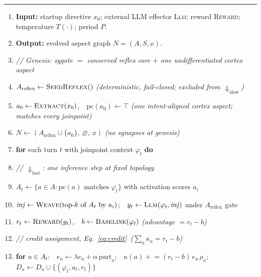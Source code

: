 \documentclass[11pt]{article}
\theoremstyle{definition}
\begin{document}
\begin{algorithm}[t]
\caption{Morphogenetic self-evolution: $\Downarrow_\text{fast}$ interleaved with $\Downarrow_\text{slow}$.}
\label{alg:man}
\small
\hrule\vspace{3pt}
\begin{enumerate}[leftmargin=2.9em,itemsep=1.5pt,topsep=2pt,parsep=0pt,label=\textup{\arabic*:}]
\item \textbf{Input:} startup directive $x_0$; external LLM effector \textsc{Llm}; reward \textsc{Reward}; temperature $T(\cdot)$; period $P$.
\item \textbf{Output:} evolved aspect graph $N=(A,S,x)$.
\item \emph{// Genesis: zygote $=$ conserved reflex core $+$ one undifferentiated cortex aspect}
\item $A_\text{reflex}\gets\textsc{SeedReflex}()$ \quad\emph{(deterministic, fail-closed; excluded from $\Downarrow_\text{slow}$)}
\item $a_0\gets\textsc{Extract}(x_0)$,\ \ $\mathrm{pc}(a_0)\gets\top$ \quad\emph{(one intent-aligned cortex aspect; matches every joinpoint)}
\item $N\gets(A_\text{reflex}\cup\{a_0\},\ \varnothing,\ x)$ \quad\emph{(no synapses at genesis)}
\item \textbf{for} each turn $t$ with joinpoint context $\varphi_t$ \textbf{do}
\item \hspace{1.2em}\emph{// $\Downarrow_\text{fast}$: one inference step at fixed topology}
\item \hspace{1.2em}$A_t\gets\{a\in A:\mathrm{pc}(a)\text{ matches }\varphi_t\}$ with activation scores $a_i$
\item \hspace{1.2em}$\mathit{inj}\gets\textsc{Weave}(\text{top-}k\text{ of }A_t\text{ by }a_i)$;\ \ $y_t\gets\textsc{Llm}(\varphi_t,\mathit{inj})$ under $A_\text{reflex}$ gate
\item \hspace{1.2em}$r_t\gets\textsc{Reward}(y_t)$,\ \ $b\gets\textsc{Baseline}(\varphi_t)$ \quad\emph{(advantage $=r_t-b$)}
\item \hspace{1.2em}\emph{// credit assignment, Eq.~\eqref{eq:credit}\, ($\textstyle\sum_a\kappa_a=r_t-b$)}
\item \hspace{1.2em}\textbf{for} $a\in A_t$:\ \ $e_a\gets\lambda e_a+\alpha\,\mathrm{part}_a$;\ \ $\kappa(a)\mathrel{+}=(r_t-b)\,e_a\,\rho_a$;\ \ $D_a\gets D_a\cup\{(\varphi_t,a_t,r_t)\}$

\end{enumerate}
\end{algorithm}
\end{document}
